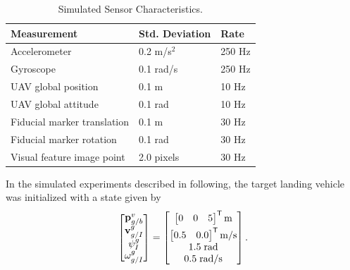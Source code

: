 \begin{table}[h!]
  \begin{center}
    \caption{Simulated Sensor Characteristics.}
    \label{tab:sim_meas_noise}
    \begin{tabular}{l|l|l}
      \textbf{Measurement} & \textbf{Std. Deviation} & \textbf{Rate} \\
      \hline
      Accelerometer & 0.2 m/s$^2$ & 250 Hz \\
      Gyroscope & 0.1 rad/s & 250 Hz \\
      UAV global position & 0.1 m & 10 Hz \\
      UAV global attitude & 0.1 rad & 10 Hz \\
      Fiducial marker translation & 0.1 m & 30 Hz \\
      Fiducial marker rotation & 0.1 rad & 30 Hz \\
      Visual feature image point & 2.0 pixels & 30 Hz \\
    \end{tabular}
  \end{center}
\end{table}

In the simulated experiments described in
following, the target landing vehicle was initialized with a state given by
\begin{equation}
  \begin{bmatrix}
    \boldsymbol{\mathrm{p}}_{g/b}^v \\
    \boldsymbol{\mathrm{v}}_{g/I}^g \\
    \psi_I^g \\
    \omega_{g/I}^g
  \end{bmatrix}
  =
  \begin{bmatrix}
    \begin{bmatrix} 0 & 0 & 5 \end{bmatrix}^{\mathsf{T}} \text{m} \\[1mm]
    \begin{bmatrix} 0.5 & 0.0 \end{bmatrix}^{\mathsf{T}} \text{m/s} \\
    1.5 \hphantom{\cdot} \text{rad} \\
    0.5 \hphantom{\cdot} \text{rad/s}
  \end{bmatrix}.
\end{equation}


